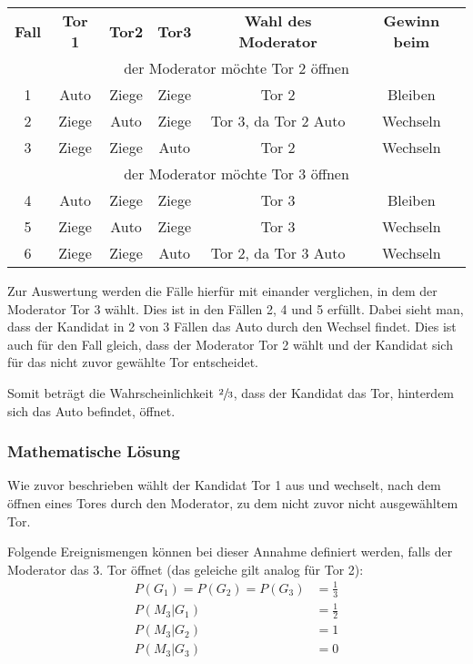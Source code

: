 \begin{tabular}[h]{cccccc}
    \textbf{Fall} & \textbf{Tor 1} & \textbf{Tor2} & \textbf{Tor3} & \textbf{Wahl des Moderator} & \textbf{Gewinn beim} \\
    \multicolumn{6}{c}{der Moderator möchte Tor 2 öffnen }                                                              \\
    1             & Auto           & Ziege         & Ziege         & Tor 2                       & Bleiben              \\
    2             & Ziege          & Auto          & Ziege         & Tor 3, da Tor 2 Auto        & Wechseln             \\
    3             & Ziege          & Ziege         & Auto          & Tor 2                       & Wechseln             \\
    \multicolumn{6}{c}{der Moderator möchte Tor 3 öffnen }                                                              \\
    4             & Auto           & Ziege         & Ziege         & Tor 3                       & Bleiben              \\
    5             & Ziege          & Auto          & Ziege         & Tor 3                       & Wechseln             \\
    6             & Ziege          & Ziege         & Auto          & Tor 2, da Tor 3 Auto        & Wechseln             \\
\end{tabular}

Zur Auswertung werden die Fälle hierfür mit einander verglichen, in dem der Moderator Tor 3 wählt. Dies ist in den Fällen 2, 4 und 5 erfüllt.
Dabei sieht man, dass der Kandidat in 2 von 3 Fällen das Auto durch den Wechsel findet. Dies ist auch für den Fall gleich, dass der Moderator Tor 2 wählt und
der Kandidat sich für das nicht zuvor gewählte Tor entscheidet.

Somit beträgt die Wahrscheinlichkeit $\sfrac{2}{3}$, dass der Kandidat das Tor, hinterdem sich das Auto befindet, öffnet.

\subsubsection{Mathematische Lösung}
Wie zuvor beschrieben wählt der Kandidat Tor 1 aus und wechselt, nach dem öffnen eines Tores durch den Moderator, zu dem nicht zuvor nicht ausgewähltem Tor.

Folgende Ereignismengen können bei dieser Annahme definiert werden, falls der Moderator das 3. Tor öffnet (das geleiche gilt analog für Tor 2):
\begin{equation}
    \begin{split}
        P(G_1) = P(G_2) = P(G_3) & = \frac{1}{3} \\
        P(M_3 | G_1) & = \frac{1}{2} \\
        P(M_3 | G_2) & = 1 \\
        P(M_3 | G_3) & = 0
    \end{split}
\end{equation}

